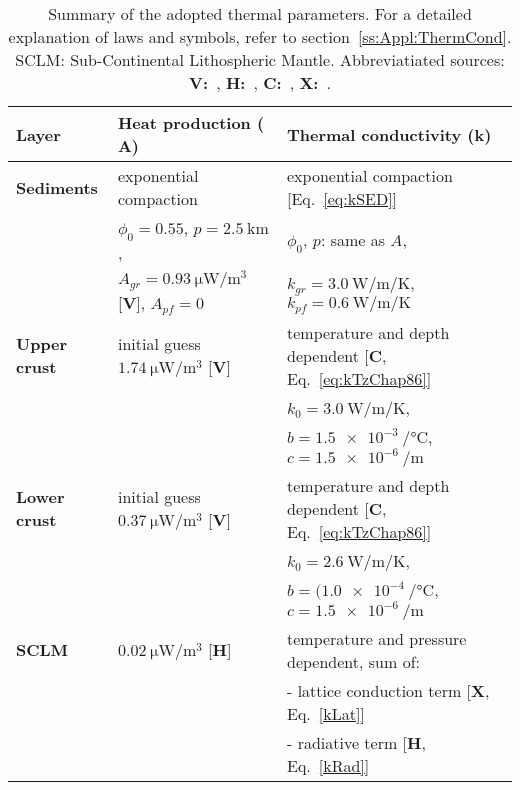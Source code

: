 \begin{table}
    \caption[Summary of the adopted thermal parameters.]{Summary of the adopted thermal parameters. For a detailed explanation of laws and symbols, refer to section~\ref{ss:Appl:ThermCond}. SCLM: Sub-Continental Lithospheric Mantle. Abbreviatiated sources: \textbf{V:}~\textcite{Vila2010}, \textbf{H:}~\textcite{Hasterok2011cont}, \textbf{C:}~\textcite{Chapman1986}, \textbf{X:}~\textcite{Xu2004}.}
    \begin{adjustbox}{center}
    \begingroup\setlength{\fboxsep}{0pt}
    \colorbox{tablebackground}{%
	\begin{tabular}{lll}
		\toprule
		 \textbf{Layer} & \textbf{Heat production ($\mathbf{A}$)} & \textbf{Thermal conductivity ($\mathbf{k}$)} \\
		\midrule
		\textbf{Sediments} & exponential compaction & exponential compaction [Eq.~\ref{eq:kSED}] \\
		& $\phi_0=\num{0.55}$, $p=\SI{2.5}{\kilo \metre}$, & $\phi_0$, $p$: same as $A$, \\
		& $A_{gr} = \SI{0.93}{\micro \watt \per \cubic \metre}$ [\textbf{V}], $A_{pf} = 0$ & $k_{gr} = \SI{3.0}{\watt \per \metre \per \kelvin}$, $k_{pf} = \SI{0.6}{\watt \per \metre \per \kelvin}$ \\
		\midrule
		\textbf{Upper crust} & initial guess $\SI{1.74}{\micro \watt \per \cubic \metre}$ [\textbf{V}] & temperature and depth dependent [\textbf{C}, Eq.~\ref{eq:kTzChap86}] \\
		& & $k_0=\SI{3.0}{\watt \per \metre \per \kelvin}$, \\
		& & $b=\SI{1.5e-3}{\per \celsius}$, $c=\SI{1.5e-6}{\per \metre}$ \\
		\midrule
		\textbf{Lower crust} & initial guess $\SI{0.37}{\micro \watt \per \cubic \metre}$ [\textbf{V}] & temperature and depth dependent [\textbf{C}, Eq.~\ref{eq:kTzChap86}]\\
		& & $k_0=\SI{2.6}{\watt \per \metre \per \kelvin}$, \\
		& & $b=(\SI{1.0e-4}{\per \celsius}$, $c=\SI{1.5e-6}{\per \metre}$ \\
		\midrule
		\textbf{SCLM} & $\SI{0.02}{\micro \watt \per \cubic \metre}$ [\textbf{H}] & temperature and pressure dependent, sum of: \\
		& & - lattice conduction term [\textbf{X}, Eq.~\ref{kLat}] \\
		& & - radiative term [\textbf{H}, Eq.~\ref{kRad}] \\
		\bottomrule
    \end{tabular}
    }\endgroup
    \end{adjustbox}
	\label{tab:ThermParams}
\end{table}

